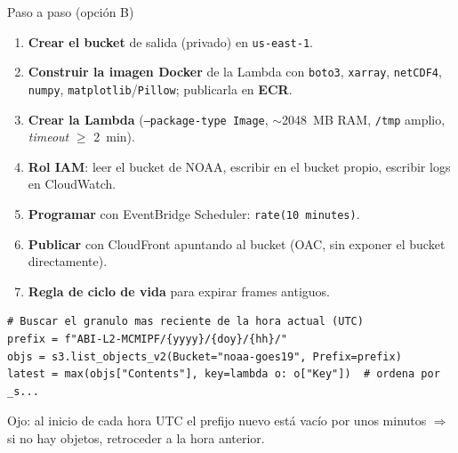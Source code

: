 \documentclass[10pt,aspectratio=169]{beamer}
\begin{document}
\begin{frame}[fragile]{Paso a paso (opción B)}
  \begin{enumerate}\small
    \item \textbf{Crear el bucket} de salida (privado) en \texttt{us-east-1}.
    \item \textbf{Construir la imagen Docker} de la Lambda con
          \texttt{boto3}, \texttt{xarray}, \texttt{netCDF4}, \texttt{numpy},
          \texttt{matplotlib}/\texttt{Pillow}; publicarla en \textbf{ECR}.
    \item \textbf{Crear la Lambda} (\texttt{--package-type Image},
          $\sim$2048~MB RAM, \texttt{/tmp} amplio, \emph{timeout} $\ge$ 2~min).
    \item \textbf{Rol IAM}: leer el bucket de NOAA, escribir en el bucket propio,
          escribir logs en CloudWatch.
    \item \textbf{Programar} con EventBridge Scheduler: \texttt{rate(10 minutes)}.
    \item \textbf{Publicar} con CloudFront apuntando al bucket
          (OAC, sin exponer el bucket directamente).
    \item \textbf{Regla de ciclo de vida} para expirar frames antiguos.
  \end{enumerate}

  \vspace{0.2em}
\begin{lstlisting}
# Buscar el granulo mas reciente de la hora actual (UTC)
prefix = f"ABI-L2-MCMIPF/{yyyy}/{doy}/{hh}/"
objs = s3.list_objects_v2(Bucket="noaa-goes19", Prefix=prefix)
latest = max(objs["Contents"], key=lambda o: o["Key"])  # ordena por _s...
\end{lstlisting}
  \footnotesize
  \textcolor{warnred}{Ojo:} al inicio de cada hora UTC el prefijo nuevo está
  vacío por unos minutos $\Rightarrow$ si no hay objetos, retroceder a la hora
  anterior.
\end{frame}
\end{document}
